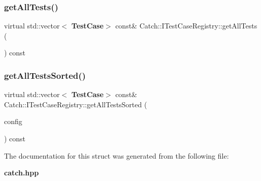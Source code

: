 \subsubsection{get\+All\+Tests()}
{\footnotesize\ttfamily virtual std\+::vector$<$\textbf{ Test\+Case}$>$ const\& Catch\+::\+I\+Test\+Case\+Registry\+::get\+All\+Tests (\begin{DoxyParamCaption}{ }\end{DoxyParamCaption}) const\hspace{0.3cm}{\ttfamily [pure virtual]}}

\mbox{\label{struct_catch_1_1_i_test_case_registry_a33e46639d0319d35497c05bb5d02be5a}} 
\subsubsection{get\+All\+Tests\+Sorted()}
{\footnotesize\ttfamily virtual std\+::vector$<$\textbf{ Test\+Case}$>$ const\& Catch\+::\+I\+Test\+Case\+Registry\+::get\+All\+Tests\+Sorted (\begin{DoxyParamCaption}\item[{I\+Config const \&}]{config }\end{DoxyParamCaption}) const\hspace{0.3cm}{\ttfamily [pure virtual]}}



The documentation for this struct was generated from the following file\+:\begin{DoxyCompactItemize}
\item 
\textbf{ catch.\+hpp}\end{DoxyCompactItemize}
